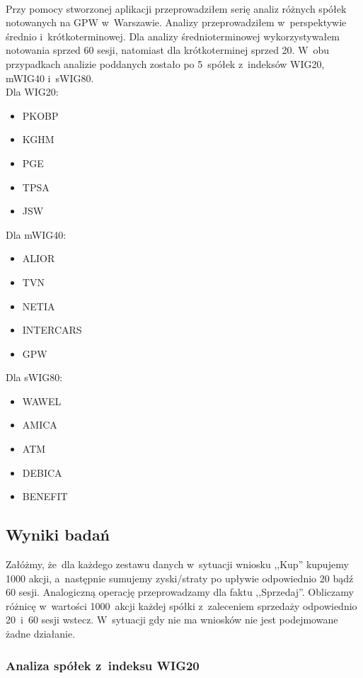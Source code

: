 \paragraph{}
Przy pomocy stworzonej aplikacji przeprowadziłem serię analiz różnych spółek notowanych na GPW w~Warszawie. Analizy przeprowadziłem w~perspektywie średnio i~krótkoterminowej. Dla analizy średnioterminowej wykorzystywałem notowania sprzed 60 sesji, natomiast dla krótkoterminej sprzed 20. W~obu przypadkach analizie poddanych zostało po 5~spółek z~indeksów WIG20, mWIG40 i~sWIG80.\\
Dla WIG20:
\begin{itemize}
	\item PKOBP
	\item KGHM
	\item PGE
	\item TPSA
	\item JSW
\end{itemize}

Dla mWIG40:
\begin{itemize}
	\item ALIOR
	\item TVN
	\item NETIA
	\item INTERCARS
	\item GPW
\end{itemize}

Dla sWIG80:
\begin{itemize}
	\item WAWEL
	\item AMICA
	\item ATM
	\item DEBICA
	\item BENEFIT
\end{itemize}

\subsection{Wyniki badań}\label{sec:wyniki_badan}

Załóżmy, że~dla każdego zestawu danych w~sytuacji wniosku ,,Kup'' kupujemy 1000 akcji, a~następnie sumujemy zyski/straty po upływie odpowiednio 20 bądź 60 sesji. Analogiczną operację przeprowadzamy dla faktu ,,Sprzedaj''. Obliczamy różnicę w~wartości 1000~akcji każdej spółki z~zaleceniem sprzedaży odpowiednio 20~i~60 sesji wstecz. W~sytuacji gdy nie ma wniosków nie jest podejmowane żadne działanie.

\subsubsection{Analiza spółek z~indeksu WIG20}

